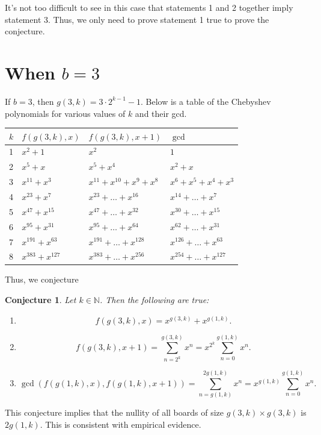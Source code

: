 \documentclass{article}
\newtheorem{conjecture}{Conjecture}
\newcommand{\N}{\mathbb{N}}
\begin{document}
	It's not too difficult to see in this case that statements 1 and 2 together imply statement 3.
	Thus, we only need to prove statement 1 true to prove the conjecture.
	
	\newpage
	\section{When $b = 3$}
	If $b=3$, then $g(3,k) = 3\cdot2^{k-1} - 1$.
	Below is a table of the Chebyshev polynomials for various values of $k$ and their gcd.
	
	\begin{table}[H]
		\renewcommand{\arraystretch}{1.5}
		\centering
		\begin{tabular}{|l||l|l|l|}
			\hline
			$k$ & $f(g(3,k),x)$ & $f(g(3,k),x+1)$ & $\gcd$  \\
			\hline\hline
			1 & $x^2 + 1$ & $x^2$ & $1$ \\
			\hline
			2 & $x^5 + x$ & $x^5 + x^4$ & $x^2 + x$ \\
			\hline
			3 & $x^{11} + x^3$ & $x^{11} + x^{10} + x^9 + x^8$ & $x^6 + x^5 + x^4 + x^3$ \\
			\hline
			4 & $x^{23} + x^{7}$ & $x^{23} + \dots + x^{16}$ & $x^{14} + \dots + x^7$ \\
			\hline
			5 & $x^{47} + x^{15}$ & $x^{47} + \dots + x^{32}$ & $x^{30} + \dots + x^{15}$ \\
			\hline
			6 & $x^{95} + x^{31}$ & $x^{95} + \dots + x^{64}$ & $x^{62} + \dots + x^{31}$ \\
			\hline
			7 & $x^{191} + x^{63}$ & $x^{191} + \dots + x^{128}$ & $x^{126} + \dots + x^{63}$ \\
			\hline
			8 & $x^{383} + x^{127}$ & $x^{383} + \dots + x^{256}$ & $x^{254} + \dots + x^{127}$ \\
			\hline  
		\end{tabular}
	\end{table}
	Thus, we conjecture
	\begin{conjecture}
		Let $k \in \N$.
		Then the following are true:
		\begin{enumerate}
			\item
			\begin{equation*}
				f(g(3,k),x) = x^{g(3,k)} + x^{g(1,k)}.
			\end{equation*}
			\item
			\begin{equation*}
				f(g(3,k),x+1) = \sum_{n=2^k}^{g(3,k)}{x^n} = x^{2^k}\sum_{n=0}^{g(1,k)}{x^n}.
			\end{equation*}
			\item
			\begin{equation*}
				\gcd\left({f(g(1,k),x), f(g(1,k),x+1)}\right) = \sum_{n=g(1,k)}^{2g(1,k)}{x^n} = x^{g(1,k)}\sum_{n=0}^{g(1,k)}{x^n}.
			\end{equation*}
		\end{enumerate}
	\end{conjecture}
	This conjecture implies that the nullity of all boards of size $g(3,k) \times g(3,k)$ is $2g(1,k)$.
	This is consistent with empirical evidence. \\
	
\end{document}

